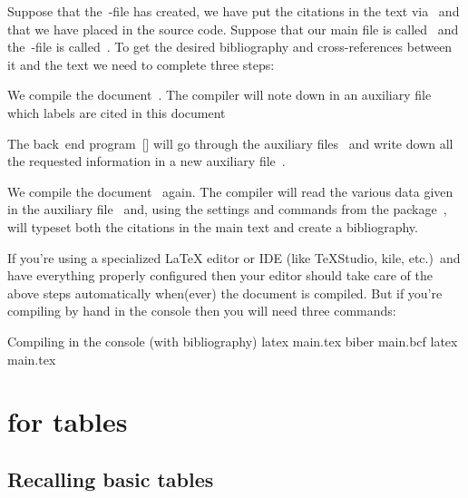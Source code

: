 Suppose that the~-file has created, we have put the citations in the text via~ and that we have placed  in the source code.
Suppose that our main file is called~ and the~-file is called~.
To get the desired bibliography and cross-references between it and the text we need to complete three steps:
\begin{myenumerate}
  \item
    We compile the document~.
    The compiler will note down in an auxiliary file~ which labels are cited in this document
  \item
    The back~end program~[\appname] will go through the auxiliary files~ and write down all the requested information in a new auxiliary file~.
  \item
    We compile the document~ again.
    The compiler will read the various data given in the auxiliary file~ and, using the settings and commands from the package~, will typeset both the citations in the main text and create a bibliography.
\end{myenumerate}
If you’re using a specialized {\LaTeX} editor or IDE (like {\TeX}Studio, kile, etc.)\ and have everything properly configured then your editor should take care of the above steps automatically when(ever) the document is compiled.
But if you’re compiling by hand in the console then you will need three commands:
\begin{showcode}{Compiling in the console (with bibliography)}
latex main.tex
biber main.bcf
latex main.tex
\end{showcode}






\section{ for tables}



\subsection{Recalling basic tables}

